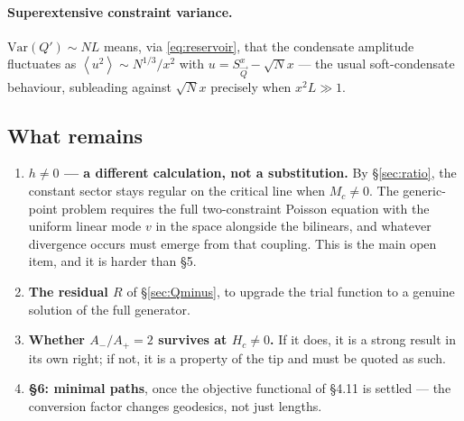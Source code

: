 \documentclass[11pt,a4paper]{article}
\newcommand{\bQ}{\vec Q}
\newcommand{\avg}[1]{\left\langle #1 \right\rangle}
\newcommand{\bQ}{\vec Q}
\newcommand{\avg}[1]{\left\langle #1 \right\rangle}
\begin{document}
\paragraph{Superextensive constraint variance.} $\mathrm{Var}(Q')\sim NL$ means, via
\eqref{eq:reservoir}, that the condensate amplitude fluctuates as
$\avg{u^2}\sim N^{1/3}/x^2$ with $u=S^x_{\bQ}-\sqrt Nx$ --- the usual soft-condensate
behaviour, subleading against $\sqrt Nx$ precisely when $x^2L\gg1$.

\subsection{What remains}
\label{sec:remaining5}
\begin{enumerate}
  \item \textbf{$h\neq0$ --- a different calculation, not a substitution.} By
        \S\ref{sec:ratio}, the constant sector stays regular on the critical line when
        $M_c\neq0$. The generic-point problem requires the full two-constraint Poisson
        equation with the uniform linear mode $v$ in the space alongside the bilinears, and
        whatever divergence occurs must emerge from that coupling. This is the main open
        item, and it is harder than \S5.
  \item \textbf{The residual $R$} of \S\ref{sec:Qminus}, to upgrade the trial function to a
        genuine solution of the full generator.
  \item \textbf{Whether $A_-/A_+=2$ survives at $H_c\neq0$.} If it does, it is a strong
        result in its own right; if not, it is a property of the tip and must be quoted as
        such.
  \item \textbf{\S6: minimal paths}, once the objective functional of \S4.11 is settled ---
        the conversion factor changes geodesics, not just lengths.
\end{enumerate}







\end{document}

